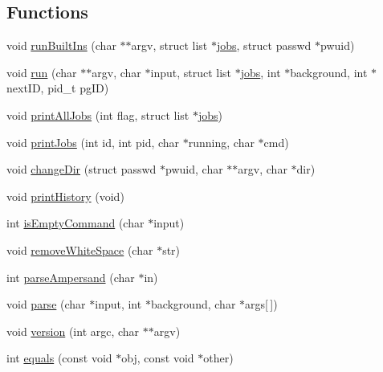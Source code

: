 \subsection*{Functions}
\begin{DoxyCompactItemize}
\item 
void \hyperlink{mydash-src_2mydash_8h_a0c88efa38e3ca069ad715ac5fbb7baed}{run\-Built\-Ins} (char $\ast$$\ast$argv, struct list $\ast$\hyperlink{p3submit_2mydash_8c_a7fbf7d423751525b8391d5e19d2f77d4}{jobs}, struct passwd $\ast$pwuid)
\item 
void \hyperlink{mydash-src_2mydash_8h_a80dc57d5db2a940022eeae60452339ee}{run} (char $\ast$$\ast$argv, char $\ast$input, struct list $\ast$\hyperlink{p3submit_2mydash_8c_a7fbf7d423751525b8391d5e19d2f77d4}{jobs}, int $\ast$background, int $\ast$next\-I\-D, pid\-\_\-t pg\-I\-D)
\item 
void \hyperlink{mydash-src_2mydash_8h_ae23098c009c74791925468628dc98022}{print\-All\-Jobs} (int flag, struct list $\ast$\hyperlink{p3submit_2mydash_8c_a7fbf7d423751525b8391d5e19d2f77d4}{jobs})
\item 
void \hyperlink{mydash-src_2mydash_8h_ad435e875f9b06471147f018f4168bb11}{print\-Jobs} (int id, int pid, char $\ast$running, char $\ast$cmd)
\item 
void \hyperlink{mydash-src_2mydash_8h_a0d5c1d0102995d5cd6d2a494dc85f069}{change\-Dir} (struct passwd $\ast$pwuid, char $\ast$$\ast$argv, char $\ast$dir)
\item 
void \hyperlink{mydash-src_2mydash_8h_a69f1a01af1a62604f48ea00b42cdd2f2}{print\-History} (void)
\item 
int \hyperlink{mydash-src_2mydash_8h_a0e33dae31e456526bb0649ec614424ba}{is\-Empty\-Command} (char $\ast$input)
\item 
void \hyperlink{mydash-src_2mydash_8h_a0c216e899ddb3dfbbaf8e261670cf80c}{remove\-White\-Space} (char $\ast$str)
\item 
int \hyperlink{mydash-src_2mydash_8h_ace4d96293e7eb7775bbdf09ac251b327}{parse\-Ampersand} (char $\ast$in)
\item 
void \hyperlink{mydash-src_2mydash_8h_aa2d345dda450a6fe9178fe7be1925dd6}{parse} (char $\ast$input, int $\ast$background, char $\ast$args\mbox{[}$\,$\mbox{]})
\item 
void \hyperlink{mydash-src_2mydash_8h_a2318f5410e5b886031286df143719636}{version} (int argc, char $\ast$$\ast$argv)
\item 
int \hyperlink{mydash-src_2mydash_8h_aa99a289bfe888ffce0d76d531146b6bf}{equals} (const void $\ast$obj, const void $\ast$other)

\end{DoxyCompactItemize}
